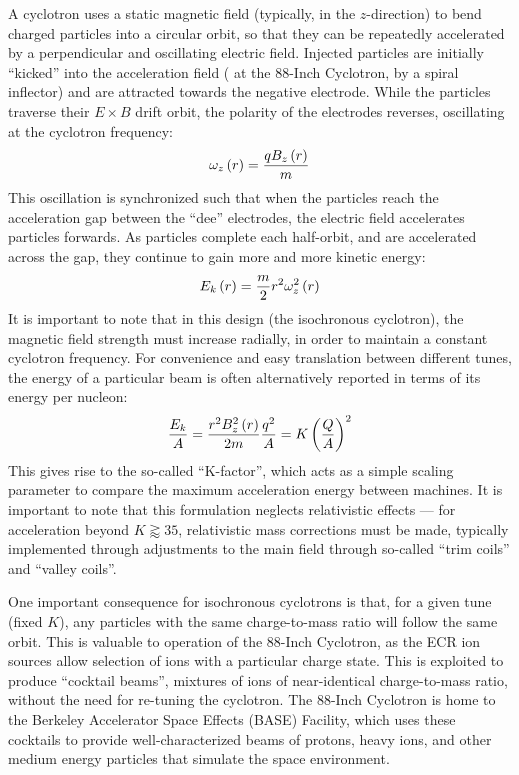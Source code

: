 A  cyclotron uses a static magnetic field (typically, in the $z$-direction) to bend charged particles into a circular orbit, so that they can be repeatedly accelerated by a perpendicular and oscillating electric field. 
Injected particles are initially \enquote{kicked} into the acceleration field ( at the 88-Inch Cyclotron, by a spiral inflector) and are attracted towards the negative electrode.
While the particles traverse their $E\times B$ drift orbit, the polarity of the electrodes reverses, oscillating at the cyclotron frequency:
\begin{equation}
\omega_z\left( r\right) = \dfrac{q B_z\left( r\right)}{m}
\end{equation}
This oscillation is synchronized such that when the particles reach the acceleration gap between the \enquote{dee} electrodes, the electric field accelerates particles forwards. 
As particles complete each half-orbit, and are accelerated across the gap, they continue to gain more and more kinetic energy:
\begin{equation}
E_k\left( r\right) = \dfrac{m}{2} r^2 \omega_z^2\left( r\right) 
\end{equation}
It is important to note that in this design (the  isochronous cyclotron), the magnetic field strength must increase radially, in order to maintain a constant cyclotron frequency.
For convenience and easy translation between different tunes, the energy of a particular beam  is often alternatively reported in terms of its energy per nucleon:
\begin{equation}
\dfrac{E_k}{A} = \dfrac{r^2 B_z^2\left( r\right) }{2 m} \dfrac{q^2}{A} = K \left( \dfrac{Q}{A}\right)^2
\end{equation}
This gives rise to the so-called \enquote{K-factor}, which acts as a simple scaling parameter to compare the maximum acceleration energy between machines.
It is important to note that this formulation neglects relativistic effects --- for acceleration beyond $K\gtrapprox 35$, relativistic mass corrections must be made, typically implemented through adjustments to the main field through so-called \enquote{trim coils} and \enquote{valley coils}.


One important consequence for  isochronous cyclotrons is that, for a given tune (fixed $K$), any particles with the same charge-to-mass ratio  will follow the same orbit.
This is valuable to operation of the 88-Inch Cyclotron, as the ECR ion sources allow selection of ions with a particular charge state.
This is exploited to produce \enquote{cocktail beams}, mixtures of ions of near-identical charge-to-mass ratio, without the need for re-tuning the cyclotron.
The 88-Inch Cyclotron is  home to the Berkeley Accelerator Space Effects (BASE) Facility, which uses these cocktails to provide well-characterized beams of protons, heavy ions, and other medium energy particles that simulate the space environment.




